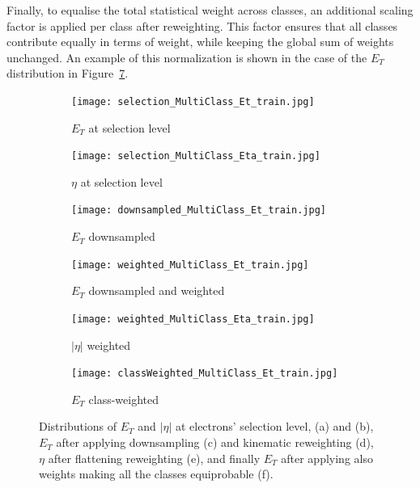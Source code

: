 Finally, to equalise the total statistical weight across classes, an additional scaling factor is applied per class after reweighting. This factor ensures that all classes contribute equally in terms of weight, while keeping the global sum of weights unchanged. An example of this normalization is shown in the case of the $E_{T}$ distribution in Figure~\ref{fig:et_eta_reweighting}.
\begin{figure}[htbp]
  \centering
  \begin{subfigure}[b]{0.48\textwidth}
      \centering
      \texttt{[image: selection\_MultiClass\_Et\_train.jpg]}
      \caption{$E_{T}$ at selection level}
      \label{fig:et_selection}
  \end{subfigure}
  \hfill
  \begin{subfigure}[b]{0.48\textwidth}
      \centering
      \texttt{[image: selection\_MultiClass\_Eta\_train.jpg]}
      \caption{$\eta$ at selection level}
      \label{fig:eta_selection}
  \end{subfigure}
  \vspace{0.4cm}
  \begin{subfigure}[b]{0.48\textwidth}
      \centering
      \texttt{[image: downsampled\_MultiClass\_Et\_train.jpg]}
      \caption{$E_{T}$ downsampled}
      \label{fig:et_downsampling}
  \end{subfigure}
  \hfill
  \begin{subfigure}[b]{0.48\textwidth}
      \centering
      \texttt{[image: weighted\_MultiClass\_Et\_train.jpg]}
      \caption{$E_{T}$ downsampled and weighted}
      \label{fig:et_reweighted}
  \end{subfigure}
  \vspace{0.4cm}
  \begin{subfigure}[b]{0.48\textwidth}
      \centering
      \texttt{[image: weighted\_MultiClass\_Eta\_train.jpg]}
      \caption{$|\eta|$ weighted}
      \label{fig:eta_reweighted}
  \end{subfigure}
  \hfill
  \begin{subfigure}[b]{0.48\textwidth}
      \centering
      \texttt{[image: classWeighted\_MultiClass\_Et\_train.jpg]}
      \caption{$E_{T}$ class-weighted }
      \label{fig:et_classWeighted}
  \end{subfigure}
  \caption{Distributions of $E_{T}$ and $|\eta|$ at electrons' selection level, (a) and (b), $E_{T}$ after applying downsampling (c) and kinematic reweighting (d), $\eta$ after flattening reweighting (e), and finally $E_{T}$ after applying also weights making all the classes equiprobable (f).}
  \label{fig:et_eta_reweighting}
\end{figure}

